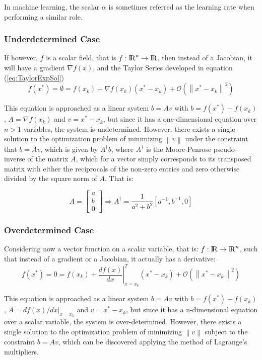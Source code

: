 \documentclass[10pt,journal,compsoc]{IEEEtran}
\newcommand{\norm}[1]{\left\lVert#1\right\rVert}
\newcommand{\ce}[1]{equation (\ref{#1})}
\newcommand{\zero}{\mathcal{O}}
\newcommand{\reals}{{\rm I\!R}}
\newcommand{\vecdisp}[3]{ \begin{bmatrix} #1\\#2\\#3\end{bmatrix}}
\begin{document}
In machine learning, the scalar $\alpha$ is sometimes referred as the learning rate when performing a similar role.


\subsubsection{Underdetermined Case}\label{sec:undetermined}
If however, $f$ is a scalar field, that is $f: \reals^n \rightarrow \reals$, then instead of a Jacobian, it will have a gradient $\nabla f(x)$, and the Taylor Series developed in \ce{eq:TaylorExpSol}
\begin{equation}\label{eq:TaylorGrad}
		f(x^*) = \emptyset = f(x_k)+\nabla f(x_k)(x^*-x_k)+\zero(\norm{x^*-x_k}^2)
\end{equation}

This equation is approached as a linear system $b = Av$ with $b = f(x^*)-f(x_k)$, $A=\nabla f(x_k)$ and $v =x^*-x_k $, but since it has a one-dimensional equation over $n>1$ variables, the system is undetermined.  However, there exists a single solution to the optimization problem of minimizing $\norm{v}$ under the constraint that $b = Av$, which is given by $A^\dagger b$, where $A^\dagger$ is the Moore-Penrose pseudo-inverse of the matrix $A$, which for a vector simply corresponds to its transposed matrix with either the reciprocals of the non-zero entries and zero otherwise divided by the square norm of $A$. That is:

\begin{equation}
	A=\vecdisp{a}{b}{0} \Rightarrow A^\dagger = \frac{1}{a^2+b^2} \left[{a^{-1}},{b^{-1}},{0}\right]
\end{equation}


\subsubsection{Overdetermined Case}\label{sec:overdetermined}
Considering now a vector function on a scalar variable, that is: $f: \reals \rightarrow \reals^n$, such that instead of a gradient or a Jacobian, it actually has a derivative: 
\begin{equation}
	f(x^*) = 0 = f(x_k)+ \left. \frac{df(x)}{dx}\right|_{x=x_k}^T (x^*-x_k)+\zero(\norm{x^*-x_k}^2) 
\end{equation}

This equation is approached as a linear system $b = Av$ with $b = f(x^*)-f(x_k)$, $A=df(x)/dx|_{x=x_k}$ and $v =x^*-x_k $, but since it has a n-dimensional equation over a scalar variable, the system is over-determined. However, there exists a single solution to the optimization problem of minimizing $\norm{v}$ subject to the constraint $b = Av$, which can be discovered applying the method of Lagrange's multipliers.
\end{document}
